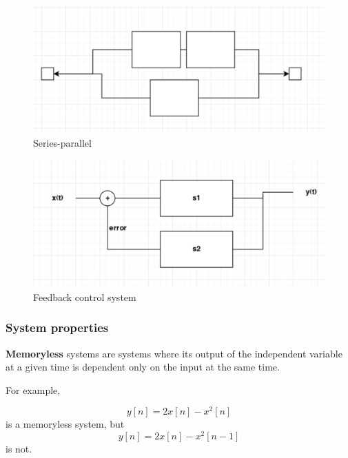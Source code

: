 \documentclass[../notes.tex]{subfiles}
\begin{document}
\begin{figure}[H]
	\centering
	\includegraphics[width=0.8\linewidth]{img/image_2022-09-21-14-29-14.png}
	\caption{Series-parallel}
\end{figure}

\begin{figure}[H]
	\centering
	\includegraphics[width=0.8\linewidth]{img/image_2022-09-21-14-30-39.png}
	\caption{Feedback control system}
\end{figure}





\subsubsection{System properties}

\begin{definition}
	\textbf{Memoryless} systems are systems where its output of the independent variable at a given time is dependent only on  the input at the same time.

	For example,

	\begin{equation}
		y[n] = 2x[n] - x^2[n]
	\end{equation}
	is a memoryless system, but 
	\begin{equation}
		y[n] = 2x[n] - x^2[n-1]
	\end{equation}
	is not.
\end{definition}
\end{document}
